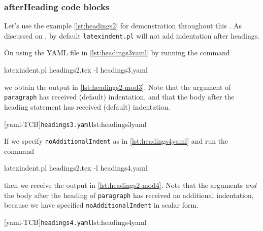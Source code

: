\subsubsection{afterHeading code blocks}\label{subsubsec-headings-no-add-indent-rules}
 Let's use the example \cref{lst:headings2} for demonstration throughout this
 . As discussed on
 , by default \texttt{latexindent.pl} will not add indentation
 after headings.


 \begin{example}
 On using the YAML file in \cref{lst:headings3yaml} by running the command

 \begin{commandshell}
latexindent.pl headings2.tex -l headings3.yaml      
\end{commandshell}

 we obtain the output in \cref{lst:headings2-mod3}. Note that the argument of
 \texttt{paragraph} has received (default) indentation, and that the body after the
 heading statement has received (default) indentation.

 \begin{cmhtcbraster}[raster column skip=.1\linewidth]
  [yaml-TCB]{\texttt{headings3.yaml}}{lst:headings3yaml}
 \end{cmhtcbraster}

 If we specify \texttt{noAdditionalIndent} as in \cref{lst:headings4yaml} and run the
 command 

 \begin{commandshell}
latexindent.pl headings2.tex -l headings4.yaml      
\end{commandshell}

 then we receive the output in \cref{lst:headings2-mod4}. Note that the arguments
 \emph{and} the body after the heading of \texttt{paragraph} has received no additional
 indentation, because we have specified \texttt{noAdditionalIndent} in scalar form.

 \begin{cmhtcbraster}[raster column skip=.1\linewidth]
  [yaml-TCB]{\texttt{headings4.yaml}}{lst:headings4yaml}
 \end{cmhtcbraster}
 \end{example}


